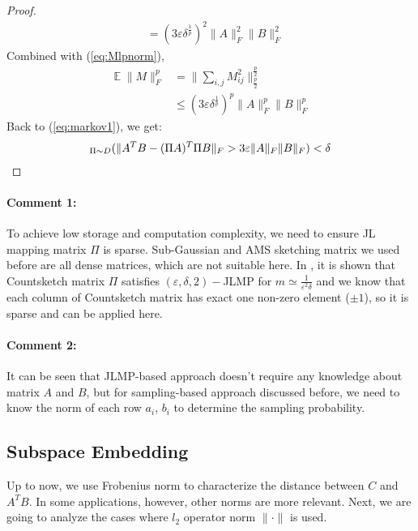 \documentclass[11pt]{article}
\DeclareMathOperator*{\E}{\mathbb{E}}
\let\Pr\relax
\DeclareMathOperator*{\Pr}{\mathbb{P}}
\newcommand{\eps}{\varepsilon}
\begin{document}
\begin{proof}
\begin{align*}
&=(3\eps\delta^{\frac{1}{p}})^2\|A\|_F^2\|B\|_F^2
\end{align*}
Combined with (\ref{eq:Mlpnorm}),
\begin{align*}
\E \|M\|_F^p &= \Big\| \sum_{i,j}M_{ij}^2 \Big\|_{\frac{p}{2}}^{\frac{p}{2}}\\
&\leq (3\eps\delta^{\frac{1}{p}})^p\|A\|_F^p\|B\|_F^p
\end{align*}
Back to (\ref{eq:markov1}), we get:
\begin{align*}
\Pr_{\Pi\sim D}(\|A^TB-(\Pi A)^T\Pi B\|_F>3\varepsilon\|A\|_F\|B\|_F) <\delta
\end{align*}
\end{proof}

\paragraph{Comment 1:}
To achieve low storage and computation complexity, we need to ensure JL mapping matrix $\Pi$ is sparse. Sub-Gaussian and AMS sketching matrix we used before are all dense matrices, which are not suitable here. In \cite{ThorupZ04}, it is shown that Countsketch matrix $\Pi$ satisfies $(\eps,\delta,2)-$JLMP for $m\simeq \frac{1}{\eps^2\delta}$ and we know that each column of Countsketch matrix has exact one non-zero element ($\pm 1$), so it is sparse and can be applied here.
\paragraph{Comment 2:}
It can be seen that JLMP-based approach doesn't require any knowledge about matrix $A$ and $B$, but for sampling-based approach discussed before, we need to know the norm of each row $a_i$, $b_i$ to determine the sampling probability.
\subsection{Subspace Embedding}
Up to now, we use Frobenius norm to characterize the distance between $C$ and $A^TB$. In some applications, however, other norms are more relevant. Next, we are going to analyze the cases where $l_2$ operator norm $\|\cdot\|$ is used.
\end{document}
